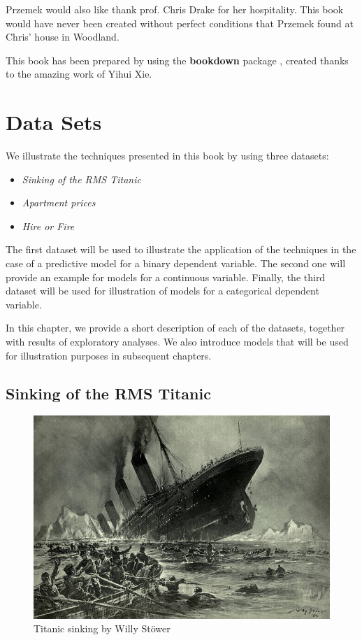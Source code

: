 \documentclass[12pt,]{krantz}
\providecommand{\tightlist}{%
  \setlength{\itemsep}{0pt}\setlength{\parskip}{0pt}}
\theoremstyle{definition}
\theoremstyle{definition}
\theoremstyle{definition}
\theoremstyle{remark}
\begin{document}
Przemek would also like thank prof. Chris Drake for her hospitality.
This book would have never been created without perfect conditions that
Przemek found at Chris' house in Woodland.

This book has been prepared by using the \textbf{bookdown} package
\citep{R-bookdown}, created thanks to the amazing work of Yihui Xie.

\hypertarget{DataSetsIntro}{%
\section{Data Sets}\label{DataSetsIntro}}

We illustrate the techniques presented in this book by using three
datasets:

\begin{itemize}
\tightlist
\item
  \emph{Sinking of the RMS Titanic}
\item
  \emph{Apartment prices}
\item
  \emph{Hire or Fire}
\end{itemize}

The first dataset will be used to illustrate the application of the
techniques in the case of a predictive model for a binary dependent
variable. The second one will provide an example for models for a
continuous variable. Finally, the third dataset will be used for
illustration of models for a categorical dependent variable.

In this chapter, we provide a short description of each of the datasets,
together with results of exploratory analyses. We also introduce models
that will be used for illustration purposes in subsequent chapters.

\hypertarget{TitanicDataset}{%
\subsection{Sinking of the RMS Titanic}\label{TitanicDataset}}

\begin{figure}
\centering
\includegraphics{figure/Titanic.jpg}
\caption{Titanic sinking by Willy Stöwer}
\end{figure}
\end{document}
